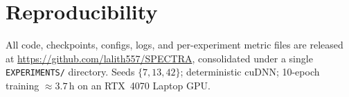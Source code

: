\section*{Reproducibility}
All code, checkpoints, configs, logs, and per-experiment metric files are
released at \url{https://github.com/lalith557/SPECTRA}, consolidated under a
single \texttt{EXPERIMENTS/} directory.%
Seeds $\{7,13,42\}$; deterministic cuDNN; 10-epoch training ${\approx}3.7$\,h on
an RTX~4070 Laptop GPU.
